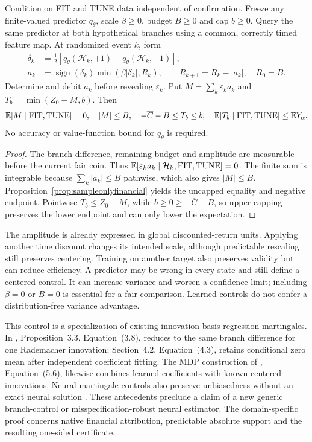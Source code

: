 \begin{proposition}
\label{prop:budgetedsigncontrol}
Condition on FIT and TUNE data independent of confirmation. Freeze any finite-valued predictor $q_\theta$, scale $\beta\ge0$, budget $B\ge0$ and cap $b\ge0$. Query the same predictor at both hypothetical branches using a common, correctly timed feature map. At randomized event $k$, form
\[
\begin{aligned}
\delta_k&=\tfrac12[q_\theta(\mathcal H_k,+1)-q_\theta(\mathcal H_k,-1)],\\
a_k&=\operatorname{sign}(\delta_k)\min(\beta|\delta_k|,R_k),
\qquad R_{k+1}=R_k-|a_k|,\quad R_0=B.
\end{aligned}
\]
Determine and debit $a_k$ before revealing $\varepsilon_k$. Put
$M=\sum_k\varepsilon_k a_k$ and $T_b=\min(Z_0-M,b)$. Then
\[
\mathbb E[M\mid{\rm FIT,TUNE}]=0,\quad |M|\le B,\quad
-\overline C-B\le T_b\le b,\quad
\mathbb E[T_b\mid{\rm FIT,TUNE}]\le\mathbb EY_\alpha.
\]
No accuracy or value-function bound for $q_\theta$ is required.
\end{proposition}
\begin{proof}
The branch difference, remaining budget and amplitude are measurable before the current fair coin. Thus
$\mathbb E[\varepsilon_k a_k\mid\mathcal H_k,{\rm FIT,TUNE}]=0$.
The finite sum is integrable because $\sum_k|a_k|\le B$ pathwise, which also gives $|M|\le B$. Proposition~\ref{prop:sampleonlyfinancial} yields the uncapped equality and negative endpoint. Pointwise $T_b\le Z_0-M$, while $b\ge0\ge-\overline C-B$, so upper capping preserves the lower endpoint and can only lower the expectation.
\end{proof}

The amplitude is already expressed in global discounted-return units. Applying another time discount changes its intended scale, although predictable rescaling still preserves centering. Training on another target also preserves validity but can reduce efficiency. A predictor may be wrong in every state and still define a centered control. It can increase variance and worsen a confidence limit; including $\beta=0$ or $B=0$ is essential for a fair comparison. Learned controls do not confer a distribution-free variance advantage.

This control is a specialization of existing innovation-basis regression martingales. In \citet{belomestny2018regression}, Proposition~3.3, Equation~(3.8), reduces to the same branch difference for one Rademacher innovation; Section~4.2, Equation~(4.3), retains conditional zero mean after independent coefficient fitting. The MDP construction of \citet{belomestny2024primaldual}, Equation~(5.6), likewise combines learned coefficients with known centered innovations. Neural martingale controls also preserve unbiasedness without an exact neural solution \cite{sabatevidales2021unbiased}. These antecedents preclude a claim of a new generic branch-control or misspecification-robust neural estimator. The domain-specific proof concerns native financial attribution, predictable absolute support and the resulting one-sided certificate.

